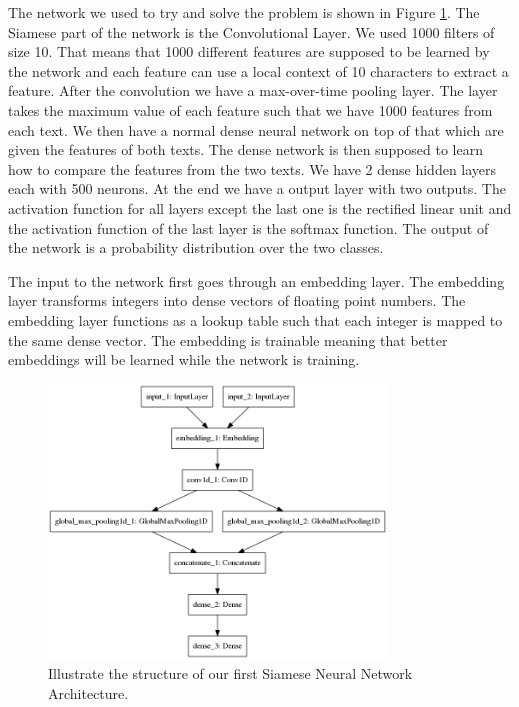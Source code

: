 The network we used to try and solve the problem is shown in Figure
\ref{fig:network_1}. The Siamese part of the network is the Convolutional
Layer. We used 1000 filters of size 10. That means that 1000 different features
are supposed to be learned by the network and each feature can use a local
context of 10 characters to extract a feature. After the convolution we have a
max-over-time pooling layer. The layer takes the maximum value of each feature
such that we have 1000 features from each text. We then have a normal dense
neural network on top of that which are given the features of both texts. The
dense network is then supposed to learn how to compare the features from the two
texts. We have 2 dense hidden layers each with 500 neurons. At the end we have
a output layer with two outputs. The activation function for all layers except
the last one is the rectified linear unit and the activation function of the
last layer is the softmax function. The output of the network is a probability
distribution over the two classes.

The input to the network first goes through an embedding layer. The embedding
layer transforms integers into dense vectors of floating point numbers. The
embedding layer functions as a lookup table such that each integer is mapped
to the same dense vector. The embedding is trainable meaning that better
embeddings will be learned while the network is training.

\begin{figure}[htb]
    \centering
    \includegraphics[width=0.8\textwidth]{./pictures/method/network1.png}
    \caption{Illustrate the structure of our first Siamese Neural Network
        Architecture.}
    \label{fig:network_1}
\end{figure}

